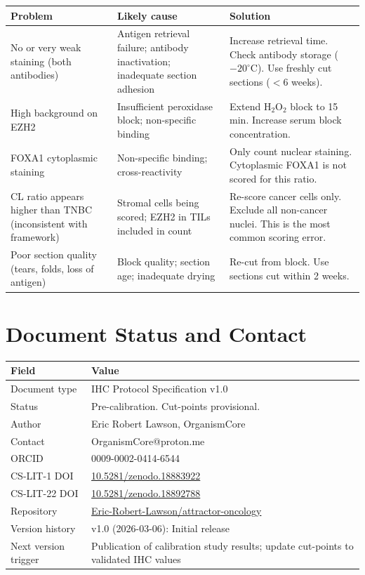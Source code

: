 \documentclass[11pt, a4paper]{article}
\begin{document}
\begin{center}
\begin{tabular}{p{4cm}p{4cm}p{5cm}}
\toprule
\textbf{Problem} &
\textbf{Likely cause} &
\textbf{Solution} \\
\midrule
No or very weak staining
(both antibodies) &
Antigen retrieval failure;
antibody inactivation;
inadequate section adhesion &
Increase retrieval time.
Check antibody storage ($-20^\circ$C).
Use freshly cut sections ($<6$ weeks). \\[0.4em]
High background on EZH2 &
Insufficient peroxidase block;
non-specific binding &
Extend $\text{H}_2\text{O}_2$
block to 15 min.
Increase serum block concentration. \\[0.4em]
FOXA1 cytoplasmic staining &
Non-specific binding;
cross-reactivity &
Only count nuclear staining.
Cytoplasmic FOXA1 is not scored
for this ratio. \\[0.4em]
CL ratio appears higher than
TNBC (inconsistent with framework) &
Stromal cells being scored;
EZH2 in TILs included in count &
Re-score cancer cells only.
Exclude all non-cancer nuclei.
This is the most common scoring error. \\[0.4em]
Poor section quality (tears,
folds, loss of antigen) &
Block quality; section age;
inadequate drying &
Re-cut from block.
Use sections cut within 2 weeks. \\
\bottomrule
\end{tabular}
\end{center}

\section{Document Status and Contact}

\begin{center}
\begin{tabular}{ll}
\toprule
\textbf{Field} & \textbf{Value} \\
\midrule
Document type &
IHC Protocol Specification v1.0 \\
Status &
Pre-calibration. Cut-points provisional. \\
Author &
Eric Robert Lawson, OrganismCore \\
Contact &
OrganismCore@proton.me \\
ORCID &
0009-0002-0414-6544 \\
CS-LIT-1 DOI &
\href{https://doi.org/10.5281/zenodo.18883922}
{10.5281/zenodo.18883922} \\
CS-LIT-22 DOI &
\href{https://doi.org/10.5281/zenodo.18892788}
{10.5281/zenodo.18892788} \\
Repository &
\href{https://github.com/Eric-Robert-Lawson/attractor-oncology}
{Eric-Robert-Lawson/attractor-oncology} \\
Version history &
v1.0 (2026-03-06): Initial release \\
Next version trigger &
Publication of calibration study results;
update cut-points to validated IHC values \\
\bottomrule
\end{tabular}
\end{center}
\end{document}
